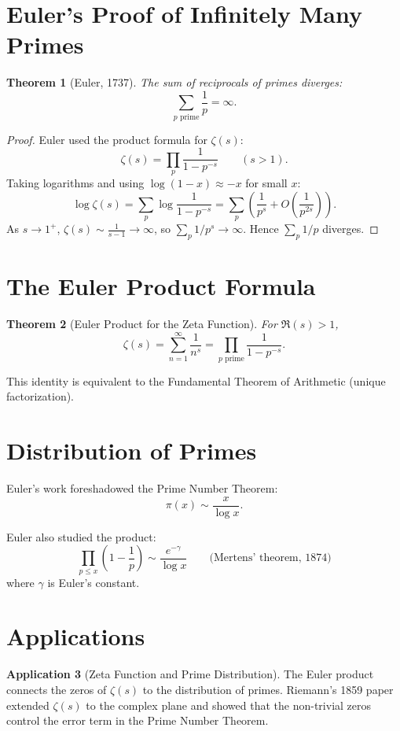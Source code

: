 \documentclass[11pt,a4paper,twoside]{book}
\theoremstyle{eulerstyle}
\newtheorem{theorem}{Theorem}[chapter]
\theoremstyle{definition}
\newtheorem{application}[theorem]{Application}
\begin{document}
\section{Euler's Proof of Infinitely Many Primes}

\begin{theorem}[Euler, 1737]
The sum of reciprocals of primes diverges:
\[
\sum_{p \text{ prime}} \frac{1}{p} = \infty.
\]
\end{theorem}

\begin{proof}
Euler used the product formula for $\zeta(s)$:
\[
\zeta(s) = \prod_{p} \frac{1}{1 - p^{-s}} \qquad (s > 1).
\]
Taking logarithms and using $\log(1-x) \approx -x$ for small $x$:
\[
\log \zeta(s) = \sum_p \log \frac{1}{1-p^{-s}} = \sum_p \left( \frac{1}{p^s} + O\left(\frac{1}{p^{2s}}\right) \right).
\]
As $s \to 1^+$, $\zeta(s) \sim \frac{1}{s-1} \to \infty$, so $\sum_p 1/p^s \to \infty$. Hence $\sum_p 1/p$ diverges.
\end{proof}

\section{The Euler Product Formula}

\begin{theorem}[Euler Product for the Zeta Function]
For $\Re(s) > 1$,
\[
\zeta(s) = \sum_{n=1}^\infty \frac{1}{n^s} = \prod_{p \text{ prime}} \frac{1}{1 - p^{-s}}.
\]
\end{theorem}

This identity is equivalent to the Fundamental Theorem of Arithmetic (unique factorization).

\section{Distribution of Primes}

Euler's work foreshadowed the Prime Number Theorem:
\[
\pi(x) \sim \frac{x}{\log x}.
\]

Euler also studied the product:
\[
\prod_{p \le x} \left(1 - \frac{1}{p}\right) \sim \frac{e^{-\gamma}}{\log x} \qquad \text{(Mertens' theorem, 1874)}
\]
where $\gamma$ is Euler's constant.

\section{Applications}

\begin{application}[Zeta Function and Prime Distribution]
The Euler product connects the zeros of $\zeta(s)$ to the distribution of primes.
Riemann's 1859 paper extended $\zeta(s)$ to the complex plane and showed that the non-trivial zeros control the error term in the Prime Number Theorem.
\end{application}
\end{document}
